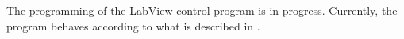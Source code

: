 %
%

\label{chap: programming}

The programming of the LabView control program is in-progress. Currently,
the program behaves according to what is described in .


\pagebreak
